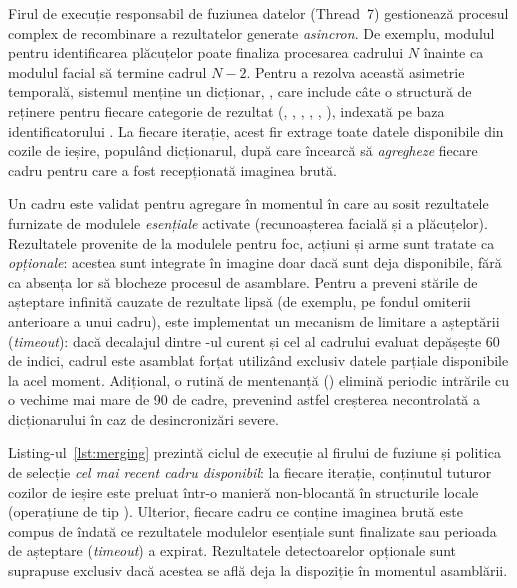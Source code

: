 \documentclass[../../main.tex]{subfiles}
\begin{document}
Firul de execuție responsabil de fuziunea datelor (Thread~7) gestionează procesul complex de recombinare a rezultatelor generate \textit{asincron}. De exemplu, modulul pentru identificarea plăcuțelor poate finaliza procesarea cadrului $N$ înainte ca modulul facial să termine cadrul $N-2$. Pentru a rezolva această asimetrie temporală, sistemul menține un dicționar, , care include câte o structură de reținere pentru fiecare categorie de rezultat (, , , , , ), indexată pe baza identificatorului . La fiecare iterație, acest fir extrage toate datele disponibile din cozile de ieșire, populând dicționarul, după care încearcă să \textit{agregheze} fiecare cadru pentru care a fost recepționată imaginea brută.

Un cadru este validat pentru agregare în momentul în care au sosit rezultatele furnizate de modulele \textit{esențiale} activate (recunoașterea facială și a plăcuțelor). Rezultatele provenite de la modulele pentru foc, acțiuni și arme sunt tratate ca \textit{opționale}: acestea sunt integrate în imagine doar dacă sunt deja disponibile, fără ca absența lor să blocheze procesul de asamblare. Pentru a preveni stările de așteptare infinită cauzate de rezultate lipsă (de exemplu, pe fondul omiterii anterioare a unui cadru), este implementat un mecanism de limitare a așteptării (\textit{timeout}): dacă decalajul dintre -ul curent și cel al cadrului evaluat depășește 60 de indici, cadrul este asamblat forțat utilizând exclusiv datele parțiale disponibile la acel moment. Adițional, o rutină de mentenanță () elimină periodic intrările cu o vechime mai mare de 90 de cadre, prevenind astfel creșterea necontrolată a dicționarului în caz de desincronizări severe.

Listing-ul~\ref{lst:merging} prezintă ciclul de execuție al firului de fuziune și politica de selecție \emph{cel mai recent cadru disponibil}: la fiecare iterație, conținutul tuturor cozilor de ieșire este preluat într-o manieră non-blocantă în structurile locale (operațiune de tip ). Ulterior, fiecare cadru ce conține imaginea brută este compus de îndată ce rezultatele modulelor esențiale sunt finalizate sau perioada de așteptare (\textit{timeout}) a expirat. Rezultatele detectoarelor opționale sunt suprapuse exclusiv dacă acestea se află deja la dispoziție în momentul asamblării.
\end{document}
